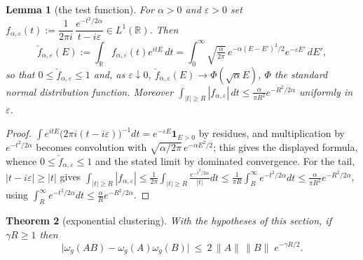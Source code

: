 \documentclass[11pt,a4paper]{article}
\theoremstyle{plain}
\newtheorem{theorem}{Theorem}[section]
\newtheorem{lemma}[theorem]{Lemma}
\theoremstyle{definition}
\newcommand{\R}{\mathbb{R}}
\begin{document}
\begin{lemma}[the test function]\label{lem:test}
For $\alpha>0$ and $\varepsilon>0$ set
$f_{\alpha,\varepsilon}(t):=\dfrac{1}{2\pi i}\,\dfrac{e^{-t^2/2\alpha}}{t-i\varepsilon}\in L^1(\R)$.
Then
\[
  \check f_{\alpha,\varepsilon}(E):=\int_\R f_{\alpha,\varepsilon}(t)e^{itE}\,dt
  =\int_0^\infty\sqrt{\tfrac{\alpha}{2\pi}}\,e^{-\alpha(E-E')^2/2}e^{-\varepsilon E'}\,dE',
\]
so that $0\le\check f_{\alpha,\varepsilon}\le1$ and, as $\varepsilon\downarrow0$,
$\check f_{\alpha,\varepsilon}(E)\to\Phi(\sqrt\alpha E)$, $\Phi$ the standard normal distribution
function. Moreover $\int_{|t|\ge R}|f_{\alpha,\varepsilon}|\,dt\le\frac{\alpha}{\pi R^2}e^{-R^2/2\alpha}$
uniformly in $\varepsilon$.
\end{lemma}

\begin{proof}
$\int e^{itE}\bigl(2\pi i(t-i\varepsilon)\bigr)^{-1}dt=e^{-\varepsilon E}\mathbf 1_{E>0}$ by
residues, and multiplication by $e^{-t^2/2\alpha}$ becomes convolution with
$\sqrt{\alpha/2\pi}\,e^{-\alpha E^2/2}$; this gives the displayed formula, whence
$0\le\check f_{\alpha,\varepsilon}\le1$ and the stated limit by dominated convergence. For the tail,
$|t-i\varepsilon|\ge|t|$ gives
$\int_{|t|\ge R}|f_{\alpha,\varepsilon}|\le\frac1{2\pi}\int_{|t|\ge R}\frac{e^{-t^2/2\alpha}}{|t|}dt
\le\frac1{\pi R}\int_R^\infty e^{-t^2/2\alpha}dt\le\frac{\alpha}{\pi R^2}e^{-R^2/2\alpha}$,
using $\int_R^\infty e^{-t^2/2\alpha}dt\le\frac{\alpha}{R}e^{-R^2/2\alpha}$.
\end{proof}

\begin{theorem}[exponential clustering]\label{thm:clust}
With the hypotheses of this section, if $\gamma R\ge1$ then
\[
  \bigl|\omega_g(AB)-\omega_g(A)\omega_g(B)\bigr|\ \le\ 2\,\|A\|\,\|B\|\;e^{-\gamma R/2}.
\]
\end{theorem}
\end{document}
